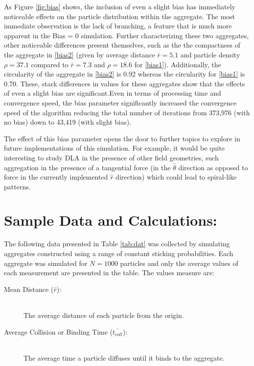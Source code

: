 \documentclass{article}
\begin{document}
\begin{appendix}
As Figure \ref{fig:bias} shows, the inclusion of even a slight bias has immediately noticeable effects on the particle distribution within the aggregate. The most immediate observation is the lack of branching, a feature that is much more apparent in the Bias = 0 simulation. Further characterizing these two aggregates, other noticeable differences present themselves, such as the the compactness of the aggregate in \ref{bias2} (given by average distance $\bar{r} = 5.1$ and particle density $\rho = 37.1$ compared to $\bar{r} = 7.3$ and $\rho = 18.6$ for \ref{bias1}). Additionally, the circularity of the aggregate in \ref{bias2} is 0.92 whereas the circularity for \ref{bias1} is 0.70. These, stark differences in values for these aggregates show that the effects of even a slight bias are significant.Even in terms of processing time and convergence speed, the bias parameter significantly increased the convergence speed of the algorithm reducing the total number of iterations from 373,976 (with no bias) down to 43,419 (with slight bias).

The effect of this bias parameter opens the door to further topics to explore in future implementations of this simulation. For example, it would be quite interesting to study DLA in the presence of other field geometries, such aggregation in the presence of a tangential force (in the $\hat{\theta}$ direction as opposed to force in the currently implemented $\hat{r}$ direction) which could lead to spiral-like patterns. 

\section{Sample Data and Calculations: \label{data}}

The following data presented in Table \ref{tab:dat} was collected by simulating aggregates constructed using a range of constant sticking probabilities. Each aggregate was simulated for $N = 1000$ particles and only the average values of each measurement are presented in the table. The values measure are:

\begin{description}
	
	\item[Mean Distance ($\bar{r}$):] \hfill \\
	The average distance of each particle from the origin.
	
	\item[Average Collision or Binding Time ($\bar{t_{coll}}$):] \hfill \\
	The average time a particle diffuses until it binds to the aggregate. 
	

\end{description}
\end{appendix}
\end{document}
